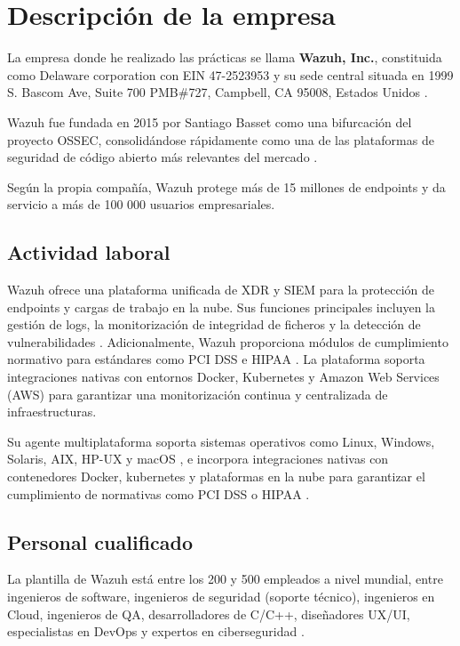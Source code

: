 \chapter{Descripción de la empresa}

La empresa donde he realizado las prácticas se llama \textbf{Wazuh, Inc.}, constituida como Delaware corporation con EIN 47-2523953 y su sede central situada en 1999 S. Bascom Ave, Suite 700 PMB\#727, Campbell, CA 95008, Estados Unidos \cite{wazuh_support_agreement}. 

Wazuh fue fundada en 2015 por Santiago Basset como una bifurcación del proyecto OSSEC, consolidándose rápidamente como una de las plataformas de seguridad de código abierto más relevantes del mercado \cite{wazuh_wikipedia_es}. 

Según la propia compañía, Wazuh protege más de 15 millones de endpoints y da servicio a más de 100 000 usuarios empresariales\cite{wazuh_homepage}. 

\section{Actividad laboral}
Wazuh ofrece una plataforma unificada de XDR y SIEM para la protección de endpoints y cargas de trabajo en la nube. Sus funciones principales incluyen la gestión de logs, la monitorización de integridad de ficheros y la detección de vulnerabilidades \cite{wazuh_homepage}\cite{wazuh_about_us}. Adicionalmente, Wazuh proporciona módulos de cumplimiento normativo para estándares como PCI DSS e HIPAA \cite{wazuh_regulatory_compliance}. La plataforma soporta integraciones nativas con entornos Docker, Kubernetes y Amazon Web Services (AWS) para garantizar una monitorización continua y centralizada de infraestructuras\cite{wazuh_agent_installation}.

Su agente multiplataforma soporta sistemas operativos como Linux, Windows, Solaris, AIX, HP-UX y macOS \cite{wazuh_agent_installation}, e incorpora integraciones nativas con contenedores Docker, kubernetes y plataformas en la nube para garantizar el cumplimiento de normativas como PCI DSS o HIPAA \cite{wazuh_regulatory_compliance}.

\section{Personal cualificado}
La plantilla de Wazuh está entre los 200 y 500 empleados a nivel mundial, entre ingenieros de software, ingenieros de seguridad (soporte técnico), ingenieros en Cloud, ingenieros de QA, desarrolladores de C/C++, diseñadores UX/UI, especialistas en DevOps y expertos en ciberseguridad \cite{linkedin_wazuh}.

